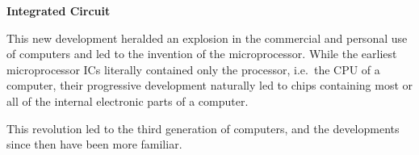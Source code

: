 \documentclass[12pt]{article}
\begin{document}
\vspace*{2em}
\noindent \textbf{Integrated Circuit}

This new development heralded an explosion in the commercial and personal use of computers and led to the invention of the microprocessor. While the earliest microprocessor ICs literally contained only the processor, i.e.\ the CPU of a computer, their progressive development naturally led to chips containing most or all of the internal electronic parts of a computer.

This revolution led to the third generation of computers, and the developments since then have been more familiar. 

%
%
%
\end{document}
